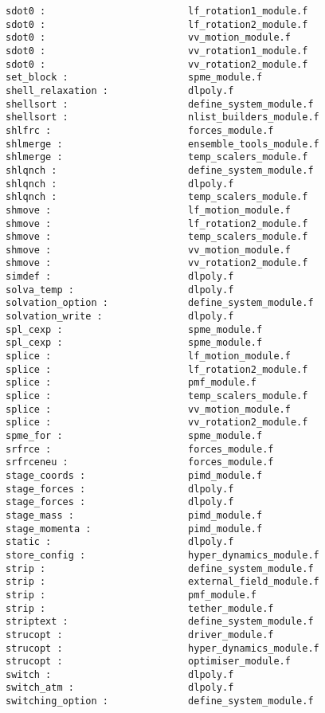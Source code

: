 \begin{verbatim}
sdot0 :                         lf_rotation1_module.f 
sdot0 :                         lf_rotation2_module.f 
sdot0 :                         vv_motion_module.f 
sdot0 :                         vv_rotation1_module.f 
sdot0 :                         vv_rotation2_module.f 
set_block :                     spme_module.f
shell_relaxation :              dlpoly.f
shellsort :                     define_system_module.f
shellsort :                     nlist_builders_module.f
shlfrc :                        forces_module.f
shlmerge :                      ensemble_tools_module.f
shlmerge :                      temp_scalers_module.f
shlqnch :                       define_system_module.f
shlqnch :                       dlpoly.f
shlqnch :                       temp_scalers_module.f
shmove :                        lf_motion_module.f
shmove :                        lf_rotation2_module.f
shmove :                        temp_scalers_module.f
shmove :                        vv_motion_module.f
shmove :                        vv_rotation2_module.f
simdef :                        dlpoly.f
solva_temp :                    dlpoly.f
solvation_option :              define_system_module.f
solvation_write :               dlpoly.f
spl_cexp :                      spme_module.f
spl_cexp :                      spme_module.f
splice :                        lf_motion_module.f
splice :                        lf_rotation2_module.f
splice :                        pmf_module.f
splice :                        temp_scalers_module.f
splice :                        vv_motion_module.f
splice :                        vv_rotation2_module.f
spme_for :                      spme_module.f
srfrce :                        forces_module.f
srfrceneu :                     forces_module.f
stage_coords :                  pimd_module.f
stage_forces :                  dlpoly.f
stage_forces :                  dlpoly.f
stage_mass :                    pimd_module.f
stage_momenta :                 pimd_module.f
static :                        dlpoly.f
store_config :                  hyper_dynamics_module.f
strip :                         define_system_module.f
strip :                         external_field_module.f
strip :                         pmf_module.f
strip :                         tether_module.f
striptext :                     define_system_module.f
strucopt :                      driver_module.f
strucopt :                      hyper_dynamics_module.f
strucopt :                      optimiser_module.f
switch :                        dlpoly.f
switch_atm :                    dlpoly.f
switching_option :              define_system_module.f

\end{verbatim}
